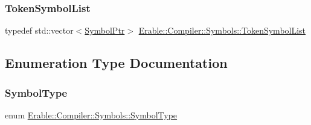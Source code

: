 \subsubsection{\texorpdfstring{TokenSymbolList}{TokenSymbolList}}
{\footnotesize\ttfamily typedef std\+::vector$<$\mbox{\hyperlink{namespace_erable_1_1_compiler_1_1_symbols_a8f0bc762f448ea4d84e8713ab3e140b9}{Symbol\+Ptr}}$>$ \mbox{\hyperlink{namespace_erable_1_1_compiler_1_1_symbols_aff1ccebebde106c3c5f3cdca118a1d69}{Erable\+::\+Compiler\+::\+Symbols\+::\+Token\+Symbol\+List}}}



\subsection{Enumeration Type Documentation}
\mbox{\label{namespace_erable_1_1_compiler_1_1_symbols_a3b60ec10cda0920ec4368128361b8320}} 
\subsubsection{\texorpdfstring{SymbolType}{SymbolType}}
{\footnotesize\ttfamily enum \mbox{\hyperlink{namespace_erable_1_1_compiler_1_1_symbols_a3b60ec10cda0920ec4368128361b8320}{Erable\+::\+Compiler\+::\+Symbols\+::\+Symbol\+Type}}\hspace{0.3cm}{\ttfamily [strong]}}

